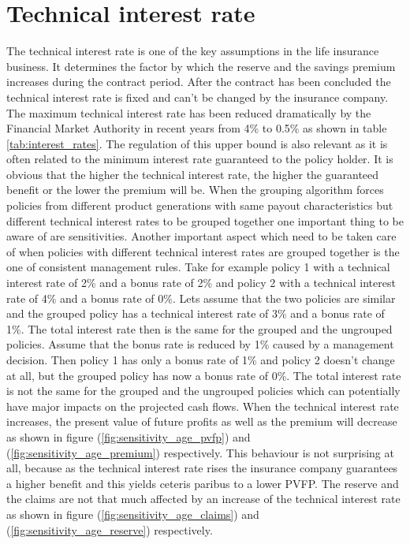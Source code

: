 \section{Technical interest rate}
\label{sec:technical_interest_rate} 
The technical interest rate is one of the key assumptions in the life insurance business. It determines the factor by which the reserve and the savings premium increases during the contract period. After the contract has been concluded the technical interest rate is fixed and can't be changed by the insurance company. The maximum technical interest rate has been reduced dramatically by the Financial Market Authority in recent years from 4\% to 0.5\% as shown in table \ref{tab:interest_rates}.  The regulation of this upper bound is also relevant as it is often related to the minimum interest rate guaranteed to the policy holder. It is obvious that the higher the  technical interest rate, the higher the guaranteed benefit or the lower the premium will be. When the grouping algorithm forces policies from different product generations with same payout characteristics but different technical interest rates to be grouped together one important thing to be aware of are sensitivities. Another important aspect which need to be taken care of when policies with different technical interest rates are grouped together is the one of consistent management rules.  Take for example policy 1 with a technical interest rate of 2\% and a bonus rate of 2\% and policy 2 with a technical interest rate of 4\% and a bonus rate of 0\%. Lets assume that the two policies are similar and the grouped policy has a technical interest rate of 3\% and a bonus rate of 1\%. The total interest rate then is the same for the grouped and the ungrouped policies. Assume that the bonus rate is reduced by 1\% caused by a management decision. Then policy 1 has only a bonus rate of 1\% and policy 2 doesn't change at all, but the grouped policy has now a bonus rate of 0\%. The total interest rate is not the same for the grouped and the ungrouped policies which can potentially have major impacts on the projected cash flows. When the technical interest rate increases, the present value of future profits as well as the premium will decrease as shown in figure (\ref{fig:sensitivity_age_pvfp}) and (\ref{fig:sensitivity_age_premium}) respectively. This behaviour is not surprising at all, because as the technical interest rate rises the insurance company guarantees a higher benefit and this yields ceteris paribus to a lower PVFP. The reserve and the claims are not that much affected by an increase of the technical interest rate as shown in figure (\ref{fig:sensitivity_age_claims}) and (\ref{fig:sensitivity_age_reserve}) respectively.




